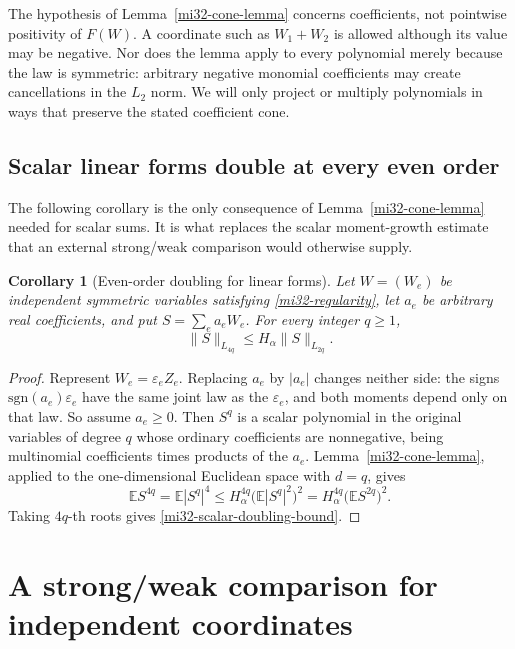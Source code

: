 \documentclass[11pt]{article}
\newtheorem{corollary}[theorem]{Corollary}
\theoremstyle{definition}
\theoremstyle{remark}
\newcommand{\E}{\mathbb E}
\newcommand{\norm}[1]{\lVert#1\rVert}
\begin{document}
The hypothesis of Lemma~\ref{mi32-cone-lemma} concerns coefficients,
not pointwise positivity of $F(W)$. A coordinate such as $W_1+W_2$ is
allowed although its value may be negative. Nor does the lemma apply to
every polynomial merely because the law is symmetric: arbitrary negative
monomial coefficients may create cancellations in the $L_2$ norm. We
will only project or multiply polynomials in ways that preserve the
stated coefficient cone.

\subsection{Scalar linear forms double at every even order}

The following corollary is the only consequence of
Lemma~\ref{mi32-cone-lemma} needed for scalar sums. It is what replaces
the scalar moment-growth estimate that an external strong/weak
comparison would otherwise supply.

\begin{corollary}[Even-order doubling for linear forms]
\label{mi32-scalar-doubling}
Let $W=(W_e)$ be independent symmetric variables satisfying
\eqref{mi32-regularity}, let $a_e$ be arbitrary real coefficients, and
put $S=\sum_ea_eW_e$. For every integer $q\ge1$,
\begin{equation}\label{mi32-scalar-doubling-bound}
 \norm{S}_{L_{4q}}\le H_\alpha\norm{S}_{L_{2q}}.
\end{equation}
\end{corollary}
\begin{proof}
Represent $W_e=\varepsilon_eZ_e$. Replacing $a_e$ by $|a_e|$ changes
neither side: the signs $\mathrm{sgn}(a_e)\varepsilon_e$ have the same
joint law as the $\varepsilon_e$, and both moments depend only on that
law. So assume $a_e\ge0$. Then $S^q$ is a scalar polynomial in the
original variables of degree $q$ whose ordinary coefficients are
nonnegative, being multinomial coefficients times products of the
$a_e$. Lemma~\ref{mi32-cone-lemma}, applied to the one-dimensional
Euclidean space with $d=q$, gives
\[
 \E S^{4q}=\E|S^q|^4\le H_\alpha^{4q}\bigl(\E|S^q|^2\bigr)^2
               =H_\alpha^{4q}\bigl(\E S^{2q}\bigr)^2 .
\]
Taking $4q$-th roots gives \eqref{mi32-scalar-doubling-bound}.
\end{proof}

\section{A strong/weak comparison for independent coordinates}
\label{mi32-comparison-section}
\end{document}
